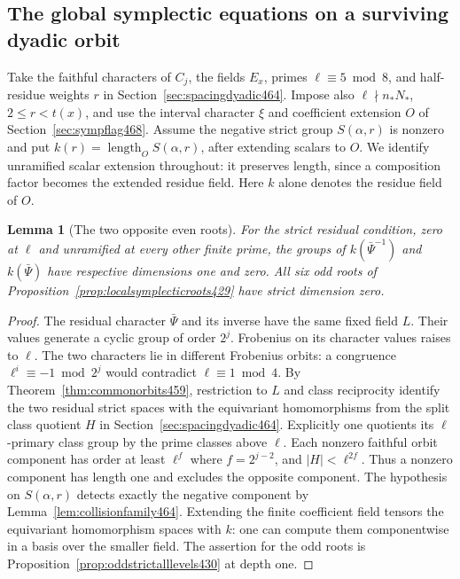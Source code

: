 \documentclass[a4paper,11pt]{article}
\newtheorem{lemma}[proposition]{Lemma}
\theoremstyle{definition}
\theoremstyle{remark}
\numberwithin{equation}{section}
\begin{document}
\subsection{The global symplectic equations on a surviving dyadic orbit}
\label{sec:sympglobal469}

Take the faithful characters of \(C_j\), the fields \(E_x\), primes
\(\ell\equiv5\bmod8\), and half-residue weights \(r\) in
Section~\ref{sec:spacingdyadic464}. Impose also
\(\ell\nmid n_*N_*\), \(2\le r<t(x)\), and use the interval character
\(\xi\) and coefficient extension \(O\) of Section~\ref{sec:sympflag468}.
Assume the negative strict group \(S(\alpha,r)\) is nonzero and put
\(k(r)=\operatorname{length}_O S(\alpha,r)\), after extending scalars
to \(O\). We identify unramified scalar extension throughout: it
preserves length, since a composition factor becomes the extended
residue field. Here \(k\) alone denotes the residue field of \(O\).

\begin{lemma}[The two opposite even roots]\leavevmode
\label{lem:oppositeroot469}
For the strict residual condition, zero at \(\ell\) and unramified
at every other finite prime, the groups of
\(k(\bar\Psi^{-1})\) and \(k(\bar\Psi)\) have respective dimensions
one and zero. All six odd roots of
Proposition~\ref{prop:localsymplecticroots429} have strict dimension zero.
\end{lemma}
\begin{proof}
The residual character \(\bar\Psi\) and its inverse have the same
fixed field \(L\). Their values generate a cyclic group of order
\(2^j\). Frobenius on its character values raises to \(\ell\).
The two characters lie in different Frobenius orbits: a congruence
\(\ell^i\equiv-1\bmod 2^j\) would contradict \(\ell\equiv1\bmod4\).
By Theorem~\ref{thm:commonorbits459}, restriction to \(L\) and
class reciprocity identify the two residual strict spaces with the
equivariant homomorphisms from the split class quotient \(H\) in
Section~\ref{sec:spacingdyadic464}. Explicitly one quotients its
\(\ell\)-primary class group by the prime classes above \(\ell\).
Each nonzero faithful orbit component has order at least \(\ell^f\)
where \(f=2^{j-2}\), and \(|H|<\ell^{2f}\). Thus a nonzero component
has length one and excludes the opposite component. The hypothesis
on \(S(\alpha,r)\) detects exactly the negative component by
Lemma~\ref{lem:collisionfamily464}. Extending the finite coefficient
field tensors the equivariant homomorphism spaces with \(k\): one can
compute them componentwise in a basis over the smaller field.
The assertion for the odd roots is
Proposition~\ref{prop:oddstrictalllevels430} at depth one.
\end{proof}
\end{document}
